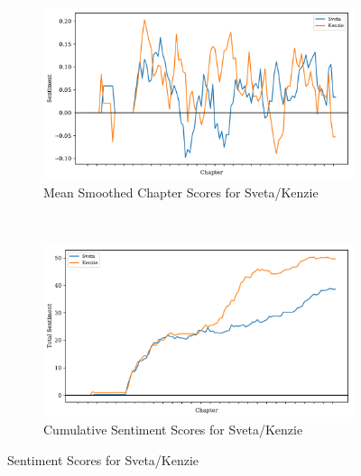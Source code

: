 \documentclass[11pt]{article}
\begin{document}
\begin{figure}[H]
\centering
\begin{subfigure}[t]{0.45\textwidth}
\centering
\includegraphics[width=\textwidth]{Fem Graphs v2/mean_smoothed_sent_scores.pdf}
\caption{Mean Smoothed Chapter Scores for Sveta/Kenzie}
\label{fem_mean}
\end{subfigure}
~
\begin{subfigure}[t]{0.45\textwidth}
\centering
\includegraphics[width=\textwidth]{Fem Graphs v2/total_sent_scores.pdf}
\caption{Cumulative Sentiment Scores for Sveta/Kenzie}
\label{fem_tot}
\end{subfigure}
\caption{Sentiment Scores for Sveta/Kenzie}
\label{fem_graphs}
\end{figure}
\end{document}
